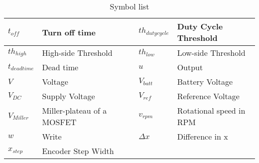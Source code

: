 \begin{table}[H]
\begin{tabular}{|p{2cm}|p{4.5cm}|l|p{2cm}|p{4.5cm}|}
$t_{off}$            & Turn off time                    &&  $th_{duty cycle}$    & Duty Cycle Threshold             \\ \hline
$th_{high}$          & High-side Threshold              &&  $th_{low}$           & Low-side Threshold               \\ \hline
$t_{dead time}$      & Dead time                        &&  $u$                  & Output                           \\ \hline
$V$                  & Voltage                          &&  $V_{batt}$           & Battery Voltage                  \\ \hline
$V_{DC}$             & Supply Voltage                   && $V_{ref}$             & Reference Voltage                \\ \hline
$V_{Miller}$         & Miller-plateau of a MOSFET       &&  $v_{rpm}$            & Rotational speed in RPM          \\ \hline
$w$                  & Write                            &&  $\Delta x$           & Difference in x                  \\ \hline
$x_{step}$           & Encoder Step  Width              &&  &       \\ \hline
\end{tabular}
\caption{Symbol list}
\label{Symbollist}
\end{table}
